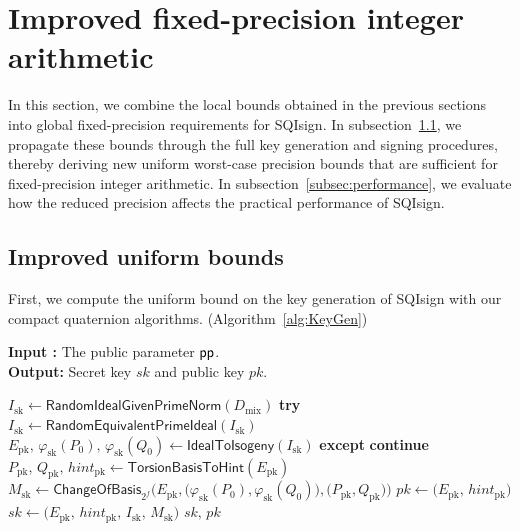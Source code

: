\section{Improved fixed-precision integer arithmetic}
\label{sec:improve}

In this section, we combine the local bounds obtained in the previous sections into global fixed-precision requirements for SQIsign.
In subsection~\ref{subsec:bound}, we propagate these bounds through the full key generation and signing procedures, thereby deriving new uniform worst-case precision bounds that are sufficient for fixed-precision integer arithmetic.
In subsection~\ref{subsec:performance}, we evaluate how the reduced precision affects the practical performance of SQIsign.

\subsection{Improved uniform bounds}
\label{subsec:bound}

First, we compute the uniform bound on the key generation of SQIsign with our compact quaternion algorithms. (Algorithm~\ref{alg:KeyGen})

\begin{algorithm}
\caption{KeyGen($\pp$)}\label{alg:KeyGen}
\textbf{Input :} The public parameter $\pp$.\\
\textbf{Output:}  Secret key $\mathit{sk}$ and public key $\mathit{pk}$.
\begin{algorithmic}[1]
  \State $I_{\mathrm{sk}} \gets \textsf{RandomIdealGivenPrimeNorm}(D_{\text{mix}})$
  \State \textbf{try}
  \State \quad $I_{\mathrm{sk}} \gets \textsf{RandomEquivalentPrimeIdeal}(I_{\mathrm{sk}})$
  \State \quad $E_{\mathrm{pk}},\, \varphi_{\mathrm{sk}}(P_{0}),\, \varphi_{\mathrm{sk}}(Q_{0})
         \gets \textsf{IdealToIsogeny}(I_{\mathrm{sk}})$
  \State \textbf{except}
  \State \quad \textbf{continue}
  \State $P_{\mathrm{pk}},\, Q_{\mathrm{pk}},\, \mathit{hint}_{\mathrm{pk}}
         \gets \textsf{TorsionBasisToHint}(E_{\mathrm{pk}})$
  \State $M_{\mathrm{sk}} \gets \textsf{ChangeOfBasis}_{2^{f}}\!\Big(E_{\mathrm{pk}},
        \big(\varphi_{\mathrm{sk}}(P_{0}),\varphi_{\mathrm{sk}}(Q_{0})\big),
        \big(P_{\mathrm{pk}},Q_{\mathrm{pk}}\big)\Big)$
  \State $\mathit{pk} \gets \big(E_{\mathrm{pk}},\, \mathit{hint}_{\mathrm{pk}}\big)$
  \State $\mathit{sk} \gets \big(E_{\mathrm{pk}},\, \mathit{hint}_{\mathrm{pk}},\, I_{\mathrm{sk}},\, M_{\mathrm{sk}}\big)$
  \State \Return $\mathit{sk},\, \mathit{pk}$
\EndWhile
\end{algorithmic}
\end{algorithm}


